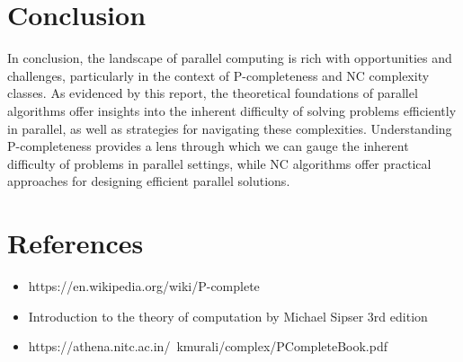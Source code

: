 \documentclass{article}
\begin{document}
\section{Conclusion}
In conclusion, the landscape of parallel computing is rich with opportunities and challenges, particularly in the context of P-completeness and NC complexity classes. As evidenced by this report, the theoretical foundations of parallel algorithms offer insights into the inherent difficulty of solving problems efficiently in parallel, as well as strategies for navigating these complexities. Understanding P-completeness provides a lens through which we can gauge the inherent difficulty of problems in parallel settings, while NC algorithms offer practical approaches for designing efficient parallel solutions. 
\section{References}
\begin{itemize}
    \item https://en.wikipedia.org/wiki/P-complete
    \item Introduction to the theory of computation by Michael Sipser 3rd edition
    \item https://athena.nitc.ac.in/~kmurali/complex/PCompleteBook.pdf
\end{itemize}
\end{document}
